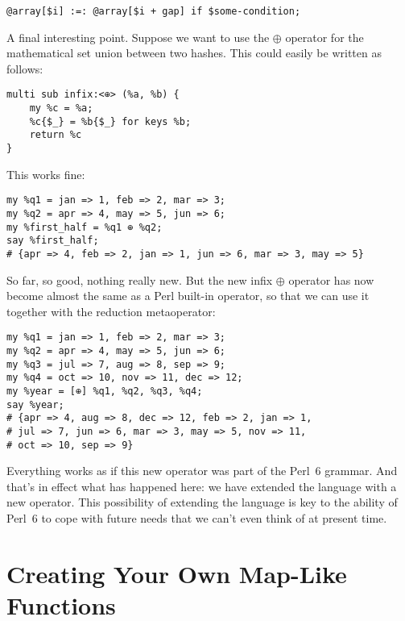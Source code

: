\begin{verbatim}
@array[$i] :=: @array[$i + gap] if $some-condition;
\end{verbatim}

A final interesting point. Suppose we want to use 
the $\oplus$ operator for the mathematical set 
union between two hashes. This could easily be 
written as follows:

\begin{verbatim}
multi sub infix:<⊕> (%a, %b) {
    my %c = %a;
    %c{$_} = %b{$_} for keys %b;
    return %c
}
\end{verbatim}

This works fine:

\begin{verbatim}
my %q1 = jan => 1, feb => 2, mar => 3;
my %q2 = apr => 4, may => 5, jun => 6;
my %first_half = %q1 ⊕ %q2;
say %first_half;
# {apr => 4, feb => 2, jan => 1, jun => 6, mar => 3, may => 5}
\end{verbatim}

So far, so good, nothing really new. But the new 
infix $\oplus$ operator has now become almost the same 
as a Perl built-in operator, so that we can use it 
together with the reduction metaoperator:

\begin{verbatim}
my %q1 = jan => 1, feb => 2, mar => 3;
my %q2 = apr => 4, may => 5, jun => 6;
my %q3 = jul => 7, aug => 8, sep => 9;
my %q4 = oct => 10, nov => 11, dec => 12;
my %year = [⊕] %q1, %q2, %q3, %q4;
say %year;
# {apr => 4, aug => 8, dec => 12, feb => 2, jan => 1, 
# jul => 7, jun => 6, mar => 3, may => 5, nov => 11, 
# oct => 10, sep => 9}
\end{verbatim}

Everything works as if this new operator was part 
of the Perl~6 grammar. And that's in effect what 
has happened here: we have extended the 
language with a new operator. This possibility of 
extending the language is key to the ability of  
Perl~6 to cope with future needs that we can't even 
think of at present time.

\section{Creating Your Own Map-Like Functions}
 
